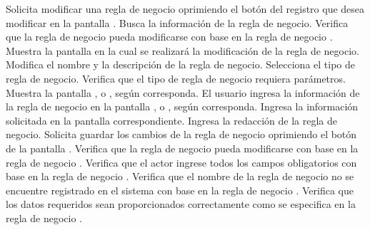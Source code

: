  \begin{UCtrayectoria}
    \UCpaso[\UCactor] Solicita modificar una regla de negocio oprimiendo el botón \btnEditar del registro que desea modificar en la pantalla .
    \UCpaso[\UCsist] Busca la información de la regla de negocio.
    \UCpaso[\UCsist] Verifica que la regla de negocio pueda modificarse con base en la regla de negocio . 
    \UCpaso[\UCsist] Muestra la pantalla  en la cual se realizará la modificación de la regla de negocio. 
    \UCpaso[\UCactor] Modifica el nombre y la descripción de la regla de negocio. \label{cu8.2:ingresaDatos}
    \UCpaso[\UCactor] Selecciona el tipo de regla de negocio. 
    \UCpaso[\UCsist] Verifica que el tipo de regla de negocio requiera parámetros. 
    \UCpaso[\UCsist] Muestra la pantalla , 
	 o
	, según corresponda.
    \UCpaso[\UCactor] El usuario ingresa la información de la regla de negocio en la pantalla , 
	 o
	, según corresponda.
    \UCpaso[\UCactor] Ingresa la información solicitada en la pantalla correspondiente. 
    \UCpaso[\UCactor] Ingresa la redacción de la regla de negocio. \label{cu8.2:redaccion}
    \UCpaso[\UCactor] Solicita guardar los cambios de la regla de negocio oprimiendo el botón  de la pantalla .  
	\UCpaso[\UCsist] Verifica que la regla de negocio pueda modificarse con base en la regla de negocio . 
    \UCpaso[\UCsist] Verifica que el actor ingrese todos los campos obligatorios con base en la regla de negocio  . 
    \UCpaso[\UCsist] Verifica que el nombre de la regla de negocio no se encuentre registrado en el sistema con base en la regla de negocio  . 
    \UCpaso[\UCsist] Verifica que los datos requeridos sean proporcionados correctamente como se especifica en la regla de negocio . 

\end{UCtrayectoria}
